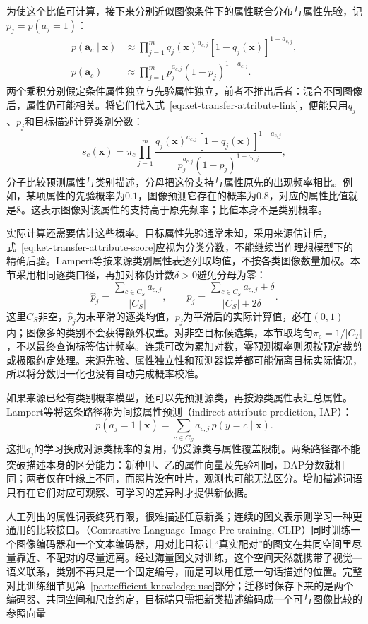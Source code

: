 为使这个比值可计算，接下来分别近似图像条件下的属性联合分布与属性先验，记$p_j=p(a_j=1)$：
\[
  \begin{aligned}
    p(\bm a_c\mid\bm x)
      &\approx\prod_{j=1}^{m}
        q_j(\bm x)^{a_{c,j}}[1-q_j(\bm x)]^{1-a_{c,j}},\\
    p(\bm a_c)
      &\approx\prod_{j=1}^{m}
        p_j^{a_{c,j}}(1-p_j)^{1-a_{c,j}}.
  \end{aligned}
\]
两个乘积分别假定条件属性独立与先验属性独立，前者不推出后者：混合不同图像后，属性仍可能相关。将它们代入式~\eqref{eq:ket-transfer-attribute-link}，便能只用$q_j$、$p_j$和目标描述计算类别分数：
\begin{equation}
  s_c(\bm x)=\pi_c
  \prod_{j=1}^{m}
  \frac{q_j(\bm x)^{a_{c,j}}
        [1-q_j(\bm x)]^{1-a_{c,j}}}
       {p_j^{a_{c,j}}(1-p_j)^{1-a_{c,j}}},
  \label{eq:ket-transfer-attribute-score}
\end{equation}
分子比较预测属性与类别描述，分母把这份支持与属性原先的出现频率相比。例如，某项属性的先验概率为$0.1$，图像预测它存在的概率为$0.8$，对应的属性比值就是8。这表示图像对该属性的支持高于原先频率；比值本身不是类别概率。

实际计算还需要估计这些概率。目标属性先验通常未知，采用来源估计后，式~\eqref{eq:ket-transfer-attribute-score}应视为分类分数，不能继续当作理想模型下的精确后验。Lampert等按来源类别属性表逐列取均值，不按各类图像数量加权。本节采用相同逐类口径，再加对称伪计数$\delta>0$避免分母为零：
\[
  \hat p_j=\frac{\sum_{c\in C_S}a_{c,j}}{|C_S|},
  \qquad
  p_j=\frac{\sum_{c\in C_S}a_{c,j}+\delta}{|C_S|+2\delta}.
\]
这里$C_S$非空，$\hat p_j$为未平滑的逐类均值，$p_j$为平滑后的实际计算值，必在$(0,1)$内；图像多的类别不会获得额外权重。对非空目标候选集，本节取均匀$\pi_c=1/|C_T|$，不以最终查询标签估计频率。连乘可改为累加对数，零预测概率则须按预定裁剪或极限约定处理。来源先验、属性独立性和预测器误差都可能偏离目标实际情况，所以将分数归一化也没有自动完成概率校准。

如果来源已经有类别概率模型，还可以先预测源类，再按源类属性表汇总属性。Lampert等将这条路径称为间接属性预测（indirect attribute prediction, IAP）：
\[
  p(a_j=1\mid\bm x)
  =\sum_{c\in C_S}a_{c,j}\,p(y=c\mid\bm x).
\]
这把$q_j$的学习换成对源类概率的复用，仍受源类与属性覆盖限制。两条路径都不能突破描述本身的区分能力：新种甲、乙的属性向量及先验相同，DAP分数就相同；两者仅在叶缘上不同，而照片没有叶片，观测也可能无法区分。增加描述词语只有在它们对应可观察、可学习的差异时才提供新依据。

人工列出的属性词表终究有限，很难描述任意新类；连续的图文表示则学习一种更通用的比较接口。（Contrastive Language--Image Pre-training, CLIP）同时训练一个图像编码器和一个文本编码器，用对比目标让“真实配对”的图文在共同空间里尽量靠近、不配对的尽量远离。经过海量图文对训练，这个空间天然就携带了视觉—语义联系，类别不再只是一个固定编号，而是可以用任意一句话描述的位置。完整对比训练细节见第~\ref{part:efficient-knowledge-use}部分；迁移时保存下来的是两个编码器、共同空间和尺度约定，目标端只需把新类描述编码成一个可与图像比较的参照向量

